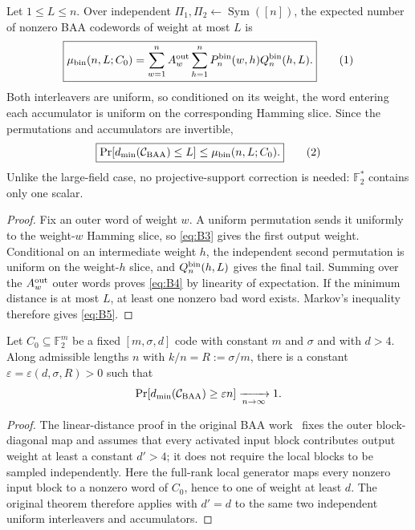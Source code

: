 \documentclass[runningheads,envcountsame,envcountsect]{llncs}
\newcommand{\F}{\mathbb F}
\newcommand{\Prb}{\Pr}
\newcommand{\cC}{\mathcal C}
\newcommand{\eqnumlabel}[1]{%
  \refstepcounter{equation}\tag{\theequation}\label{#1}%
}
\begin{document}
\begin{theorem}
\label{thm:exact-binary-first-moment}
Let $1\le L\le n$.  Over independent
$\Pi_1,\Pi_2\gets\operatorname{Sym}([n])$, the expected number of nonzero BAA
codewords of weight at most $L$ is
\[
    \boxed{
    \mu_{\rm bin}(n,L;C_0)
      =
    \sum_{w=1}^{n}A_w^{\rm out}
    \sum_{h=1}^{n}
      P_n^{\rm bin}(w,h)
      Q_n^{\rm bin}(h,L).
    }
    \eqnumlabel{eq:B4}
\]
Both interleavers are uniform, so conditioned on its weight, the word entering
each accumulator is uniform on the corresponding Hamming slice.  Since the
permutations and accumulators are invertible,
\[
    \boxed{
    \Prb[d_{\min}(\cC_{\rm BAA})\le L]
      \le
    \mu_{\rm bin}(n,L;C_0).
    }
    \eqnumlabel{eq:B5}
\]
Unlike the large-field case, no projective-support correction is needed:
$\F_2^\ast$ contains only one scalar.
\end{theorem}

\begin{proof}
Fix an outer word of weight $w$.  A uniform permutation sends it uniformly to
the weight-$w$ Hamming slice, so \eqref{eq:B3} gives the first output weight.  Conditional
on an intermediate weight $h$, the independent second permutation is uniform
on the weight-$h$ slice, and $Q_n^{\rm bin}(h,L)$ gives the final tail.
Summing over the $A_w^{\rm out}$ outer words proves \eqref{eq:B4} by linearity of
expectation.  If the minimum distance is at most $L$, at least one nonzero bad
word exists.  Markov's inequality therefore gives \eqref{eq:B5}.
\end{proof}

\begin{corollary}
\label{cor:binary-linear-distance}
Let $C_0\subseteq\F_2^m$ be a fixed $[m,\sigma,d]$ code with constant $m$ and
$\sigma$ and with $d>4$.  Along admissible lengths $n$ with
$k/n=R:=\sigma/m$, there is a constant
$\varepsilon=\varepsilon(d,\sigma,R)>0$ such that
\[
    \Prb\!\left[
        d_{\min}(\cC_{\rm BAA})\ge \varepsilon n
    \right]
    \xrightarrow[n\to\infty]{}1.
\]
\end{corollary}

\begin{proof}
The linear-distance proof in the original BAA work~\cite{baa26} fixes the outer
block-diagonal map and assumes that every activated input block contributes
output weight at least a constant $d'>4$; it does not require the local blocks
to be sampled independently.  Here the full-rank local generator maps every
nonzero input block to a nonzero word of $C_0$, hence to one of weight at least
$d$.  The original theorem therefore applies with $d'=d$ to the same two
independent uniform interleavers and accumulators.
\end{proof}
\end{document}
